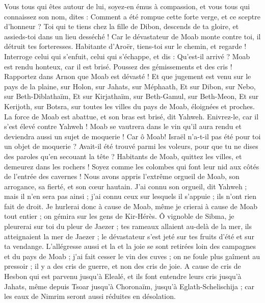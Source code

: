 \begin{multicols}{2}
Vous tous qui êtes autour de lui, soyez-en émus à compassion, et vous tous qui connaissez son nom, dites : Comment a été rompue cette forte verge, et ce sceptre d'honneur ? 
Toi qui te tiens chez la fille de Dibon, descends de ta gloire, et assieds-toi dans un lieu desséché ! Car le dévastateur de Moab monte contre toi, il détruit tes forteresses.
Habitante d'Aroër, tiens-toi sur le chemin, et regarde ! Interroge celui qui s'enfuit, celui qui s'échappe, et dis : Qu'est-il arrivé ?
Moab est rendu honteux, car il est brisé. Poussez des gémissements et des cris ! Rapportez dans Arnon que Moab est dévasté !
Et que jugement est venu sur le pays de la plaine, sur Holon, sur Jahats, sur Méphaath,
Et sur Dibon, sur Nebo, sur Beth-Diblathaïm,
Et sur Kirjathaïm, sur Beth-Gamul, sur Beth-Meon,
Et sur Kerijoth, sur Botsra, sur toutes les villes du pays de Moab, éloignées et proches.
La force de Moab est abattue, et son bras est brisé, dit Yahweh.
Enivrez-le, car il s'est élevé contre Yahweh ! Moab se vautrera dans le vin qu'il aura rendu et deviendra aussi un sujet de moquerie !
Car ô Moab! Israël n'a-t-il pas été pour toi un objet de moquerie ? Avait-il été trouvé parmi les voleurs, pour que tu ne dises des paroles qu'en secouant la tête ?
Habitants de Moab, quittez les villes, et demeurez dans les rochers ! Soyez comme les colombes qui font leur nid aux côtés de l'entrée des cavernes !
Nous avons appris l'extrême orgueil de Moab, son arrogance, sa fierté, et son cœur hautain.
J'ai connu son orgueil, dit Yahweh ; mais il n'en sera pas ainsi ; j'ai connu ceux sur lesquels il s'appuie ; ils n'ont rien fait de droit. 
Je hurlerai donc à cause de Moab, même je crierai à cause de Moab tout entier ; on gémira sur les gens de Kir-Hérès.
Ô vignoble de Sibma, je pleurerai sur toi du pleur de Jaezer ; tes rameaux allaient au-delà de la mer, ils atteignaient la mer de Jaezer ; le dévastateur s'est jeté sur tes fruits d'été et sur ta vendange.
L'allégresse aussi et la et la joie se sont retirées loin des campagnes et du pays de Moab ; j'ai fait cesser le vin des cuves ; on ne foule plus gaîment au pressoir ; il y a des cris de guerre, et non des cris de joie.
A cause de cris de Hesbon qui est parvenu jusqu'à Elealé, et ils font entendre leurs cris jusqu'à Jahats, même depuis Tsoar jusqu'à Choronaïm, jusqu'à Eglath-Schelischija ; car les eaux de Nimrim seront aussi réduites en désolation.

\end{multicols}
